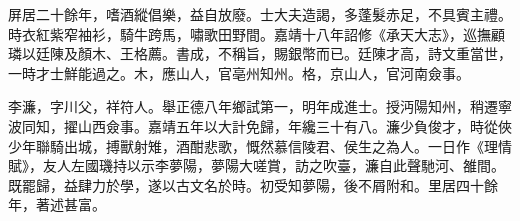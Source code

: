 \begin{pinyinscope}
屏居二十餘年，嗜酒縱倡樂，益自放廢。士大夫造謁，多蓬髮赤足，不具賓主禮。時衣紅紫窄袖衫，騎牛跨馬，嘯歌田野間。嘉靖十八年詔修《承天大志》，巡撫顧璘以廷陳及顏木、王格薦。書成，不稱旨，賜銀幣而已。廷陳才高，詩文重當世，一時才士鮮能過之。木，應山人，官亳州知州。格，京山人，官河南僉事。

李濂，字川父，祥符人。舉正德八年鄉試第一，明年成進士。授沔陽知州，稍遷寧波同知，擢山西僉事。嘉靖五年以大計免歸，年纔三十有八。濂少負俊才，時從俠少年聯騎出城，搏獸射雉，酒酣悲歌，慨然慕信陵君、侯生之為人。一日作《理情賦》，友人左國璣持以示李夢陽，夢陽大嗟賞，訪之吹臺，濂自此聲馳河、雒間。既罷歸，益肆力於學，遂以古文名於時。初受知夢陽，後不屑附和。里居四十餘年，著述甚富。


\end{pinyinscope}